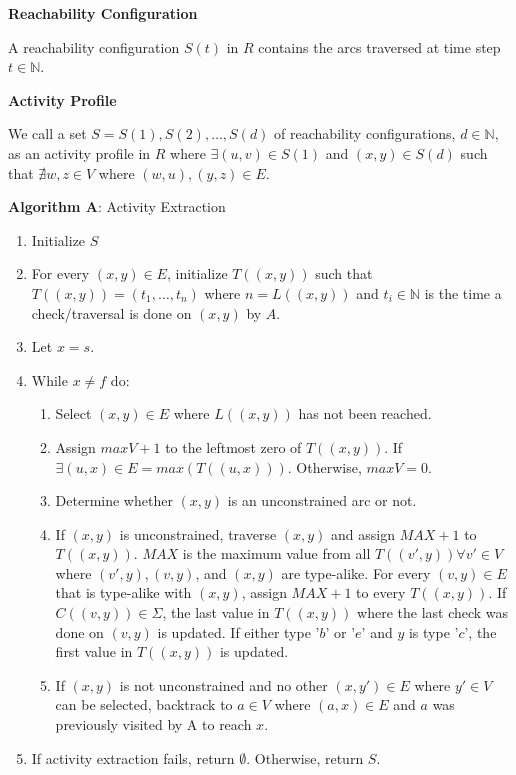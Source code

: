         \begin{definition} \textbf{Reachability Configuration} \cite{malinao-rdlt}

        A reachability configuration $S(t)$ in $R$ contains the arcs traversed at time step $t \in \mathbb{N}$.
            
        \end{definition}

        \begin{definition} \textbf{Activity Profile} \cite{malinao-rdlt}

        We call a set $S = S(1), S(2), \ldots, S(d)$ of reachability configurations, $d \in \mathbb{N}$, as an activity profile in $R$ where $\exists(u,v) \in S(1)$ and $(x,y) \in S(d)$ such that $ \nexists w,z \in V$ where $(w,u),(y,z) \in E$.
            
        \end{definition}

        \textbf{Algorithm A}: Activity Extraction \cite{malinao-rdlt}
        \begin{enumerate}
            \item Initialize $S$
            \item For every $(x,y) \in E$, initialize $T((x,y))$ such that $T((x,y)) = (t_{1},\ldots,t_{n})$ where $n = L((x,y))$ and $t_{i} \in \mathbb{N}$ is the time a check/traversal is done on $(x,y)$ by $A$.
            \item Let $x = s$.
            \item While $x \neq f$ do:
                \begin{enumerate}
                    \item Select $(x,y) \in E$ where $L((x,y))$ has not been reached.
                    \item Assign $maxV + 1$ to the leftmost zero of $T((x,y))$. If $\exists(u,x) \in E = max(T((u,x)))$. Otherwise, $maxV = 0$.
                    \item Determine whether $(x,y)$ is an unconstrained arc or not.
                    \item If $(x,y)$ is unconstrained, traverse $(x,y)$ and assign $MAX+1$ to $T((x,y))$. $MAX$ is the maximum value from all $T((v',y)) \forall v' \in V$ where $(v',y),(v,y)$, and $(x,y)$ are type-alike. For every $(v,y) \in E$ that is type-alike with $(x,y)$, assign $MAX+1$ to every $T((x,y))$. If $C((v,y)) \in \Sigma$, the last value in $T((x,y))$ where the last check was done on $(v,y)$ is updated. If either type '$b$' or '$e$' and $y$ is type '$c$', the first value in $T((x,y))$ is updated.
                    \item If $(x,y)$ is not unconstrained and no other $(x,y') \in E$ where $y' \in V$ can be selected, backtrack to $a \in V$ where $(a,x) \in E$ and $a$ was previously visited by A to reach $x$.
                \end{enumerate}
            \item If activity extraction fails, return $\emptyset$. Otherwise, return $S$.
        \end{enumerate}

